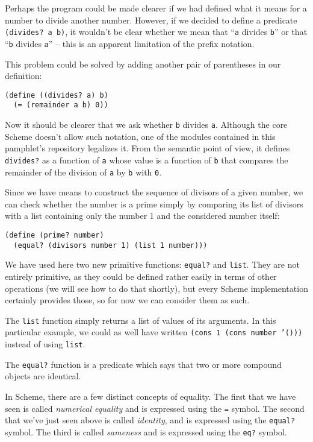 Perhaps the program could be made clearer if we had defined what it
means for a number to divide another number. However, if we decided
to define a predicate \texttt{(divides? a b)}, it wouldn't be clear
whether we mean that ``\texttt{a} divides \texttt{b}'' or that
``\texttt{b} divides \texttt{a}'' -- this is an apparent limitation
of the prefix notation.

This problem could be solved by adding another pair of parentheses
in our definition:

\begin{Verbatim}[samepage=true]
(define ((divides? a) b)
  (= (remainder a b) 0))
\end{Verbatim}

Now it should be clearer that we ask whether \texttt{b} divides
\texttt{a}.
Although the core Scheme doesn't allow such notation, one of
the modules contained in this pamphlet's repository legalizes
it. From the semantic point of view, it defines \texttt{divides?}
as a function of \texttt{a} whose value is a function of \texttt{b}
that compares the remainder of the division of \texttt{a} by
\texttt{b} with \texttt{0}.

Since we have means to construct the sequence of divisors of a given
number, we can check whether the number is a prime simply by comparing
its list of divisors with a list containing only the number 1 and
the considered number itself:

\begin{Verbatim}[samepage=true]
(define (prime? number)
  (equal? (divisors number 1) (list 1 number)))
\end{Verbatim}

We have used here two new primitive functions: \texttt{equal?} and
\texttt{list}. They are not entirely primitive, as they could be
defined rather easily in terms of other operations (we will see how
to do that shortly), but every Scheme implementation certainly
provides those, so for now we can consider them as such.

The \texttt{list} function simply returns a list of values of
its arguments. In this particular example, we could as well have written
\texttt{(cons 1 (cons number '()))} instead of using \texttt{list}.

The \texttt{equal?} function is a predicate which says that two
or more compound objects are identical.

In Scheme, there are a few distinct concepts of equality. The first
that we have seen is called \textit{numerical equality} and is
expressed using the \texttt{=} symbol. The second that we've just
seen above is called \textit{identity}, and is expressed using
the \texttt{equal?} symbol.
The third is called \textit{sameness} and is expressed using
the \texttt{eq?} symbol.

